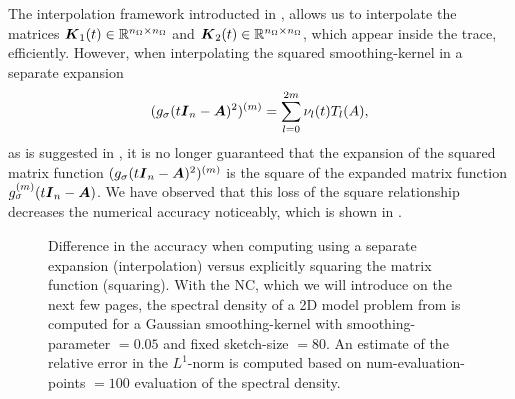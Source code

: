 The interpolation framework introducted in ,
allows us to interpolate the matrices $\boldsymbol{K}_1(t) \in \mathbb{R}^{n_{\Omega} \times n_{\Omega}}$
and $\boldsymbol{K}_2(t) \in \mathbb{R}^{n_{\Omega} \times n_{\Omega}}$,
which appear inside the trace, efficiently.
However, when interpolating the
squared \gls{smoothing-kernel} in a separate expansion
\begin{equation}
    (g_{\sigma}(t\boldsymbol{I}_n - \boldsymbol{A})^2)^{(m)} = \sum_{l=0}^{2m} \nu_l(t) T_l(A),
    \label{equ:3-nystrom-ESS-chebyshev-expansion}
\end{equation}
as is suggested in \cite{lin2017randomized}, it is no longer guaranteed that
the expansion of the squared matrix function $(g_{\sigma}(t\boldsymbol{I}_n - \boldsymbol{A})^2)^{(m)}$
is the square of the expanded matrix function $g_{\sigma}^{(m)}(t\boldsymbol{I}_n - \boldsymbol{A})$.
We have observed that this loss of the square relationship
decreases the numerical accuracy noticeably, which is
shown in .\\
\begin{figure}[ht]
    \centering
    
    \caption{Difference in the accuracy when computing 
        using a separate expansion (interpolation) versus explicitly squaring
        the matrix function (squaring). With the \gls{NC}, which we will introduce
        on the next few pages, the spectral density of a 2D model problem from
        is computed for a Gaussian \gls{smoothing-kernel} with \gls{smoothing-parameter} $=0.05$
        and fixed \gls{sketch-size} $=80$. An estimate of the relative error
        in the $L^1$-norm is computed based on \gls{num-evaluation-points} $=100$
        evaluation of the spectral density.}
    \label{fig:3-nystrom-interpolation-issue}
\end{figure}

